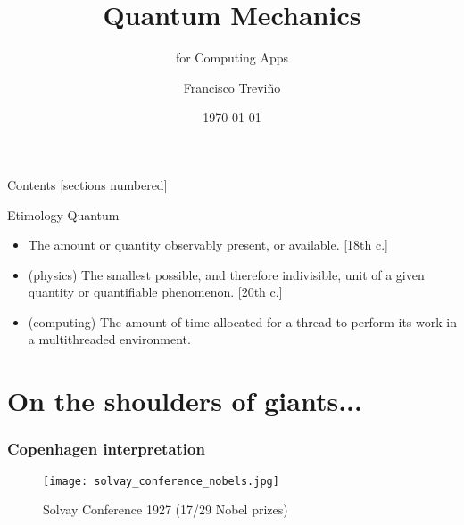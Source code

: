 \documentclass[10pt]{beamer}
\title{Quantum Mechanics}
\subtitle{for Computing Apps}
\date{\today}
\author{Francisco Treviño}
\institute{\alert{Continental} México}
\begin{document}
\maketitle

\begin{frame}{Contents}
  [sections numbered]
  \tableofcontents[hideallsubsections]
\end{frame}


\begin{frame}[fragile]{Etimology}
Quantum
\begin{itemize}
\item The amount or quantity observably present, or available. [18th c.] 
\item (physics) The smallest possible, and therefore indivisible, unit of a given quantity or quantifiable phenomenon. [20th c.] 
\item (computing) The amount of time allocated for a thread to perform its work in a multithreaded environment.
\end{itemize}
\end{frame}

\section{On the shoulders of giants...}

\begin{frame}
\frametitle{Copenhagen interpretation}
\begin{figure}
\texttt{[image: solvay\_conference\_nobels.jpg]}
\caption{Solvay Conference 1927 (17/29 Nobel prizes)}
\end{figure}
\end{frame}
\end{document}
